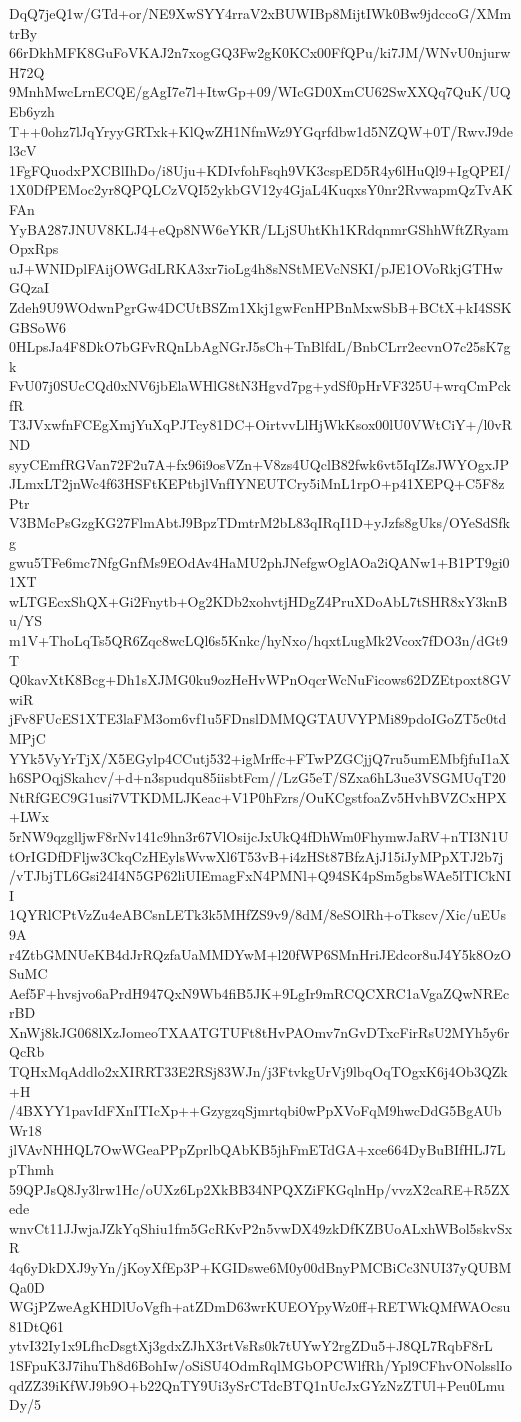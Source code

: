 DqQ7jeQ1w/GTd+or/NE9XwSYY4rraV2xBUWIBp8MijtIWk0Bw9jdccoG/XMmtrBy
66rDkhMFK8GuFoVKAJ2n7xogGQ3Fw2gK0KCx00FfQPu/ki7JM/WNvU0njurwH72Q
9MnhMwcLrnECQE/gAgI7e7l+ItwGp+09/WIcGD0XmCU62SwXXQq7QuK/UQEb6yzh
T++0ohz7lJqYryyGRTxk+KlQwZH1NfmWz9YGqrfdbw1d5NZQW+0T/RwvJ9del3cV
1FgFQuodxPXCBlIhDo/i8Uju+KDIvfohFsqh9VK3cspED5R4y6lHuQl9+IgQPEI/
1X0DfPEMoc2yr8QPQLCzVQI52ykbGV12y4GjaL4KuqxsY0nr2RvwapmQzTvAKFAn
YyBA287JNUV8KLJ4+eQp8NW6eYKR/LLjSUhtKh1KRdqnmrGShhWftZRyamOpxRps
uJ+WNIDplFAijOWGdLRKA3xr7ioLg4h8sNStMEVcNSKI/pJE1OVoRkjGTHwGQzaI
Zdeh9U9WOdwnPgrGw4DCUtBSZm1Xkj1gwFcnHPBnMxwSbB+BCtX+kI4SSKGBSoW6
0HLpsJa4F8DkO7bGFvRQnLbAgNGrJ5sCh+TnBlfdL/BnbCLrr2ecvnO7c25sK7gk
FvU07j0SUcCQd0xNV6jbElaWHlG8tN3Hgvd7pg+ydSf0pHrVF325U+wrqCmPckfR
T3JVxwfnFCEgXmjYuXqPJTcy81DC+OirtvvLlHjWkKsox00lU0VWtCiY+/l0vRND
syyCEmfRGVan72F2u7A+fx96i9osVZn+V8zs4UQclB82fwk6vt5IqIZsJWYOgxJP
JLmxLT2jnWc4f63HSFtKEPtbjlVnfIYNEUTCry5iMnL1rpO+p41XEPQ+C5F8zPtr
V3BMcPsGzgKG27FlmAbtJ9BpzTDmtrM2bL83qIRqI1D+yJzfs8gUks/OYeSdSfkg
gwu5TFe6mc7NfgGnfMs9EOdAv4HaMU2phJNefgwOglAOa2iQANw1+B1PT9gi01XT
wLTGEcxShQX+Gi2Fnytb+Og2KDb2xohvtjHDgZ4PruXDoAbL7tSHR8xY3knBu/YS
m1V+ThoLqTs5QR6Zqc8wcLQl6s5Knkc/hyNxo/hqxtLugMk2Vcox7fDO3n/dGt9T
Q0kavXtK8Bcg+Dh1sXJMG0ku9ozHeHvWPnOqcrWcNuFicows62DZEtpoxt8GVwiR
jFv8FUcES1XTE3laFM3om6vf1u5FDnslDMMQGTAUVYPMi89pdoIGoZT5c0tdMPjC
YYk5VyYrTjX/X5EGylp4CCutj532+igMrffc+FTwPZGCjjQ7ru5umEMbfjfuI1aX
h6SPOqjSkahcv/+d+n3spudqu85iisbtFcm//LzG5eT/SZxa6hL3ue3VSGMUqT20
NtRfGEC9G1usi7VTKDMLJKeac+V1P0hFzrs/OuKCgstfoaZv5HvhBVZCxHPX+LWx
5rNW9qzglljwF8rNv141c9hn3r67VlOsijcJxUkQ4fDhWm0FhymwJaRV+nTI3N1U
tOrIGDfDFljw3CkqCzHEylsWvwXl6T53vB+i4zHSt87BfzAjJ15iJyMPpXTJ2b7j
/vTJbjTL6Gsi24I4N5GP62liUIEmagFxN4PMNl+Q94SK4pSm5gbsWAe5lTICkNII
1QYRlCPtVzZu4eABCsnLETk3k5MHfZS9v9/8dM/8eSOlRh+oTkscv/Xic/uEUs9A
r4ZtbGMNUeKB4dJrRQzfaUaMMDYwM+l20fWP6SMnHriJEdcor8uJ4Y5k8OzOSuMC
Aef5F+hvsjvo6aPrdH947QxN9Wb4fiB5JK+9LgIr9mRCQCXRC1aVgaZQwNREcrBD
XnWj8kJG068lXzJomeoTXAATGTUFt8tHvPAOmv7nGvDTxcFirRsU2MYh5y6rQcRb
TQHxMqAddlo2xXIRRT33E2RSj83WJn/j3FtvkgUrVj9lbqOqTOgxK6j4Ob3QZk+H
/4BXYY1pavIdFXnITIcXp++GzygzqSjmrtqbi0wPpXVoFqM9hwcDdG5BgAUbWr18
jlVAvNHHQL7OwWGeaPPpZprlbQAbKB5jhFmETdGA+xce664DyBuBIfHLJ7LpThmh
59QPJsQ8Jy3lrw1Hc/oUXz6Lp2XkBB34NPQXZiFKGqlnHp/vvzX2caRE+R5ZXede
wnvCt11JJwjaJZkYqShiu1fm5GcRKvP2n5vwDX49zkDfKZBUoALxhWBol5skvSxR
4q6yDkDXJ9yYn/jKoyXfEp3P+KGIDswe6M0y00dBnyPMCBiCc3NUI37yQUBMQa0D
WGjPZweAgKHDlUoVgfh+atZDmD63wrKUEOYpyWz0ff+RETWkQMfWAOcsu81DtQ61
ytvI32Iy1x9LfhcDsgtXj3gdxZJhX3rtVsRs0k7tUYwY2rgZDu5+J8QL7RqbF8rL
1SFpuK3J7ihuTh8d6BohIw/oSiSU4OdmRqlMGbOPCWlfRh/Ypl9CFhvONolsslIo
qdZZ39iKfWJ9b9O+b22QnTY9Ui3ySrCTdcBTQ1nUcJxGYzNzZTUl+Peu0LmuDy/5
